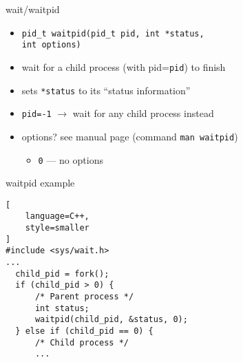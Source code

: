 \begin{frame}{wait/waitpid}
\begin{itemize}
\item \texttt{pid\_t waitpid(pid\_t pid, int *status, \\
              \hspace{5cm} int options)}
\item wait for a child process (with pid=\texttt{pid}) to finish
\item sets \texttt{*status} to its ``status information''
\vspace{.5cm}
\item \texttt{pid=-1} $\rightarrow$ wait for any child process instead
\item options? see manual page (command \texttt{man waitpid})
    \begin{itemize}
        \item \texttt{0} --- no options
    \end{itemize}
\end{itemize}
\end{frame}

\begin{frame}[fragile,label=waitpidExample]{waitpid example}
\begin{lstlisting}[
    language=C++,
    style=smaller
]
#include <sys/wait.h>
...
  child_pid = fork();
  if (child_pid > 0) {
      /* Parent process */
      int status;
      waitpid(child_pid, &status, 0);
  } else if (child_pid == 0) {
      /* Child process */
      ...
\end{lstlisting}
\end{frame}

